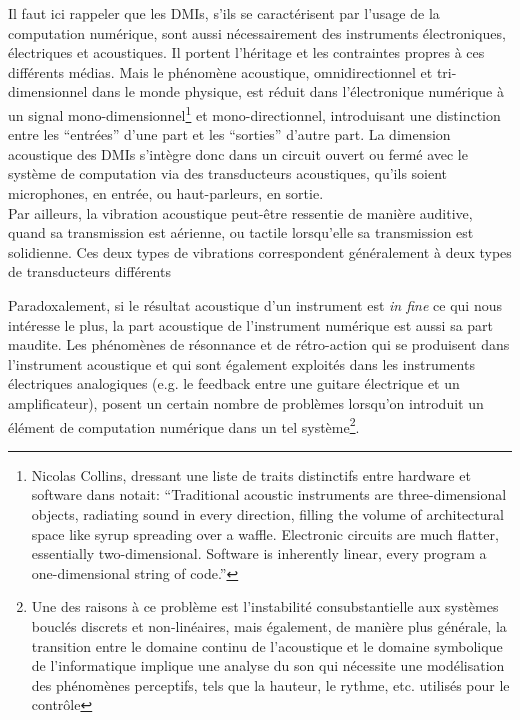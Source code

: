 \noindent Il faut ici rappeler que les \glspl{DMI}, s'ils se caractérisent par l'usage de la computation numérique, sont aussi nécessairement des instruments électroniques, électriques et acoustiques. Il portent l'héritage et les contraintes propres à ces différents médias. Mais le phénomène acoustique, omnidirectionnel et tri-dimensionnel dans le monde physique, est réduit dans l'électronique numérique à un signal mono-dimensionnel\footnote{Nicolas Collins, dressant une liste de traits distinctifs entre hardware et software dans \cite{collins_semiconducting_2013} notait: ``Traditional acoustic instruments are three-dimensional objects, radiating sound in every direction, filling the volume of architectural space like syrup spreading over a waffle. Electronic circuits are much flatter, essentially two-dimensional. Software is inherently linear, every program a one-dimensional string of code.''} et mono-directionnel, introduisant une distinction entre les ``entrées'' d'une part et les ``sorties'' d'autre part. La dimension acoustique des \glspl{DMI} s'intègre donc dans un circuit ouvert ou fermé avec le système de computation via des transducteurs acoustiques, qu'ils soient microphones, en entrée, ou haut-parleurs, en sortie.\\
\indent Par ailleurs, la vibration acoustique peut-être ressentie de manière auditive, quand sa transmission est aérienne, ou tactile lorsqu'elle sa transmission est solidienne. Ces deux types de vibrations correspondent généralement à deux types de transducteurs différents

\indent Paradoxalement, si le résultat acoustique d'un instrument est \textit{in fine} ce qui nous intéresse le plus, la part acoustique de l'instrument numérique est aussi sa part maudite. Les phénomènes de résonnance et de rétro-action qui se produisent dans l'instrument acoustique et qui sont également exploités dans les instruments électriques analogiques (e.g. le feedback entre une guitare électrique et un amplificateur), posent un certain nombre de problèmes lorsqu'on introduit un élément de computation numérique dans un tel système\footnote{Une des raisons à ce problème est l'instabilité consubstantielle aux systèmes bouclés discrets et non-linéaires, mais également, de manière plus générale, la transition entre le domaine continu de l'acoustique et le domaine symbolique de l'informatique implique une analyse du son qui nécessite une modélisation des phénomènes perceptifs, tels que la hauteur, le rythme, etc. utilisés pour le contrôle}.\\

